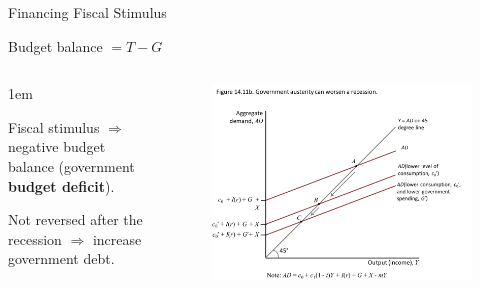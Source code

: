 \documentclass[11pt,aspectratio=43,usenames,dvipsnames]{beamer}
\let\olditemize=\itemize
\let\endolditemize=\enditemize
\renewenvironment{itemize}{\olditemize \itemsep1em}{\endolditemize}
\theoremstyle{definition}
\begin{document}
\begin{frame}{Financing Fiscal Stimulus}
\label{slide:Financing_Fiscal_Stimulus}
    \begin{center}
        Budget balance $ = T - G $
    \end{center}

    \begin{columns}
        \begin{column}{0.4\textwidth}
            \begin{itemize}
                \item Fiscal stimulus $ \Rightarrow  $ negative budget balance (government \textbf{budget deficit}).
                \item Not reversed after the recession $ \Rightarrow  $ \alert{increase government debt}.
            \end{itemize}
        \end{column}
        \begin{column}{0.6\textwidth}
            \begin{figure}
                \centering
                \includegraphics[width=\textwidth]{./figures/15.pdf}
                \caption{}
            \end{figure}

        \end{column}
    \end{columns}
\end{frame}
\end{document}
